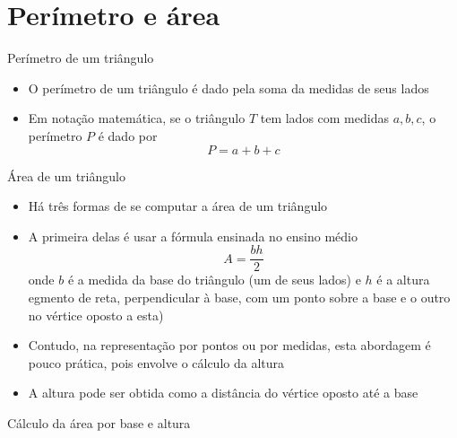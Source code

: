 \section{Perímetro e área}

\begin{frame}[fragile]{Perímetro de um triângulo}

    \begin{itemize}
        \item O perímetro de um triângulo é dado pela soma da medidas de seus lados

        \item Em notação matemática, se o triângulo $T$ tem lados com medidas $a, b, c$, o
            perímetro $P$ é dado por
        \[
            P = a + b + c
        \]
    \end{itemize}


\end{frame}

\begin{frame}[fragile]{Área de um triângulo}

    \begin{itemize}
        \item Há três formas de se computar a área de um triângulo

        \item A primeira delas é usar a fórmula ensinada no ensino médio
            \[
                A = \frac{bh}{2}
            \]
        onde $b$ é a medida da base do triângulo (um de seus lados) e $h$ é a altura
        egmento de reta, perpendicular à base, com um ponto sobre a base e o outro no vértice 
        oposto a esta)

        \item Contudo, na representação por pontos ou por medidas, esta abordagem é pouco 
            prática, pois envolve o cálculo da altura

        \item A altura pode ser obtida como a distância do vértice oposto até a base
    \end{itemize}

\end{frame}

\begin{frame}[fragile]{Cálculo da área por base e altura}
\end{frame}

